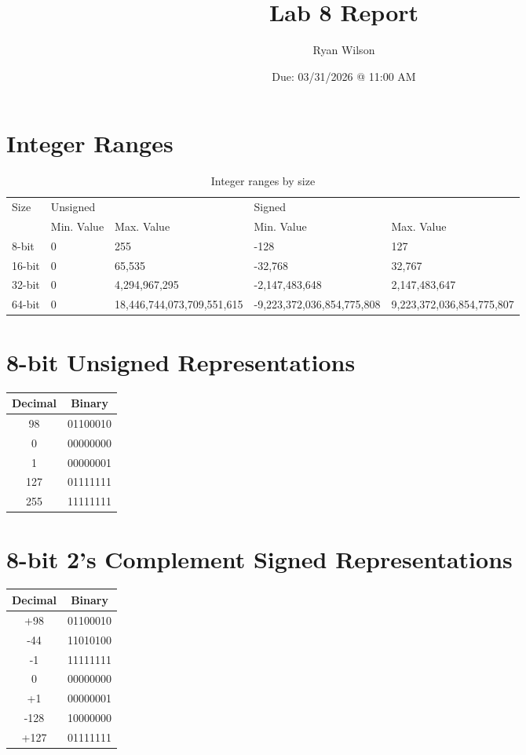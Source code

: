 \documentclass{article}
\title{Lab 8 Report}
\date{Due: 03/31/2026 @ 11:00 AM}
\author{Ryan Wilson}
\begin{document}
\maketitle
\newpage

\section{Integer Ranges}
\begin{table}[h!]
\caption{Integer ranges by size}
\label{int-ranges}
\begin{tabular}{lllll}
\multirow{2}{*}{Size} & \multicolumn{2}{l}{Unsigned} & \multicolumn{2}{l}{Signed} \\
& Min. Value & Max. Value & Min. Value & Max. Value \\
\hline
8-bit & 0 & 255 & -128 & 127 \\
16-bit & 0 & 65,535 & -32,768 & 32,767 \\
32-bit & 0 & 4,294,967,295 & -2,147,483,648 & 2,147,483,647 \\
64-bit & 0 & 18,446,744,073,709,551,615 & -9,223,372,036,854,775,808 & 9,223,372,036,854,775,807 \\
\end{tabular}
\end{table}

\section{8-bit Unsigned Representations}
\begin{tabular}{cc}
  Decimal & Binary \\
  \hline
  98 & 01100010 \\
  0 & 00000000 \\
  1 & 00000001 \\
  127 & 01111111 \\
  255 & 11111111 \\
\end{tabular}

\section{8-bit 2's Complement Signed Representations}
\begin{tabular}{cc}
  Decimal & Binary \\
  \hline
  +98 & 01100010 \\
  -44 & 11010100 \\
  -1 & 11111111 \\
  0 & 00000000 \\
  +1 & 00000001 \\
  -128 & 10000000 \\
  +127 & 01111111 \\
\end{tabular}
\newpage
\end{document}
